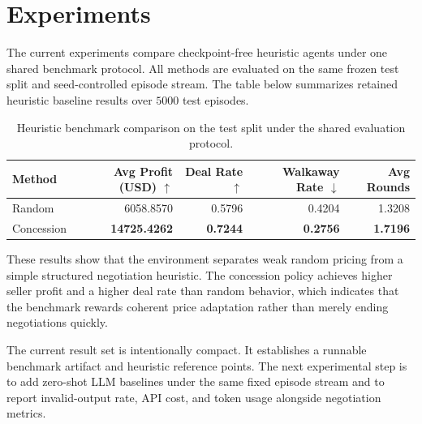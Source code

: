 \section{Experiments}
\label{sec:experiments}

The current experiments compare checkpoint-free heuristic agents under one shared benchmark protocol. All methods are evaluated on the same frozen test split and seed-controlled episode stream. The table below summarizes retained heuristic baseline results over \(5000\) test episodes.

\begin{table}[t]
  \centering
  \caption{Heuristic benchmark comparison on the test split under the shared evaluation protocol.}
  \label{tab:core_benchmark_results}
  \small
  \begin{tabular}{lrrrr}
    \toprule
    Method & Avg Profit (USD) \(\uparrow\) & Deal Rate \(\uparrow\) & Walkaway Rate \(\downarrow\) & Avg Rounds \\
    \midrule
    Random & 6058.8570 & 0.5796 & 0.4204 & 1.3208 \\
    Concession & \textbf{14725.4262} & \textbf{0.7244} & \textbf{0.2756} & \textbf{1.7196} \\
    \bottomrule
  \end{tabular}
\end{table}

These results show that the environment separates weak random pricing from a simple structured negotiation heuristic. The concession policy achieves higher seller profit and a higher deal rate than random behavior, which indicates that the benchmark rewards coherent price adaptation rather than merely ending negotiations quickly.

The current result set is intentionally compact. It establishes a runnable benchmark artifact and heuristic reference points. The next experimental step is to add zero-shot LLM baselines under the same fixed episode stream and to report invalid-output rate, API cost, and token usage alongside negotiation metrics.
